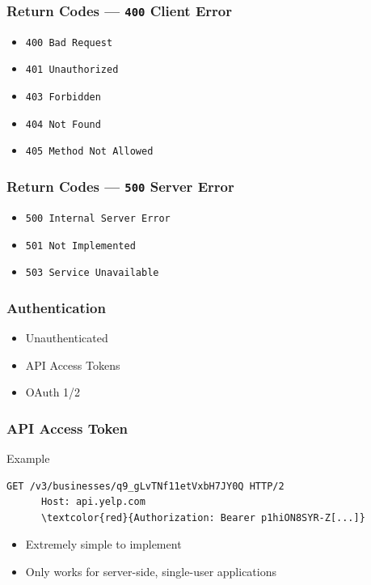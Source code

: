 \documentclass{beamer}
\begin{document}
\begin{frame}
  \frametitle{Return Codes --- \texttt{400} Client Error}
  \begin{itemize}
    \item \texttt{400 Bad Request}
    \item \texttt{401 Unauthorized}
    \item \texttt{403 Forbidden}
    \item \texttt{404 Not Found}
    \item \texttt{405 Method Not Allowed}
  \end{itemize}
\end{frame}


\begin{frame}
  \frametitle{Return Codes --- \texttt{500} Server Error}
  \begin{itemize}
    \item \texttt{500 Internal Server Error}
    \item \texttt{501 Not Implemented}
    \item \texttt{503 Service Unavailable}
  \end{itemize}
\end{frame}


\begin{frame}
  \frametitle{Authentication}
  \begin{itemize}
    \item Unauthenticated
    \item API Access Tokens
    \item OAuth 1/2
  \end{itemize}
\end{frame}


\begin{frame}[fragile=singleslide]
  \frametitle{API Access Token}
  \begin{block}{Example}
    \begin{Verbatim}[commandchars=\\\{\}]
      GET /v3/businesses/q9_gLvTNf11etVxbH7JY0Q HTTP/2
      Host: api.yelp.com
      \textcolor{red}{Authorization: Bearer p1hiON8SYR-Z[...]}
    \end{Verbatim}
  \end{block}
  
  \begin{itemize}
    \item Extremely simple to implement
    \item Only works for server-side, single-user applications
  \end{itemize}
\end{frame}
\end{document}
